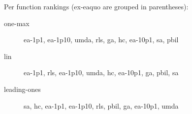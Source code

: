 Per function rankings (ex-eaquo are grouped in parentheses):
\begin{description}
\item[one-max]
ea-1p1, ea-1p10, umda, rls, ga, hc, ea-10p1, sa, pbil

\item[lin]
ea-1p1, rls, ea-1p10, umda, hc, ea-10p1, ga, pbil, sa

\item[leading-ones]
sa, hc, ea-1p1, ea-1p10, rls, pbil, ga, ea-10p1, umda

\end{description}
